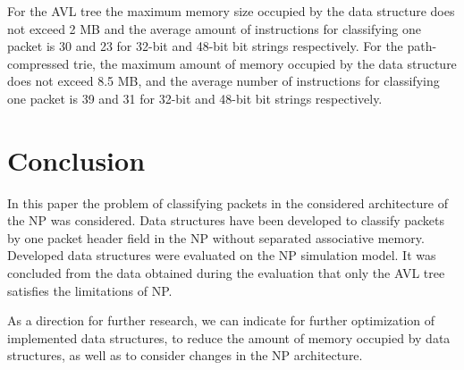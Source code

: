 \documentclass[conference]{IEEEtran}
\begin{document}
            For the AVL tree the maximum memory size occupied 
            by the data structure does not exceed 2 MB and the average amount of
            instructions for classifying one packet is 30 and 23 for 32-bit and 48-bit bit strings respectively.
            For the path-compressed trie, the maximum amount of memory occupied 
            by the data structure does not exceed 8.5 MB, and the average number of
            instructions for classifying one packet is 39 and 31 for 32-bit and 48-bit bit strings respectively.

    \section{Conclusion}
        In this paper the problem of classifying packets in the considered architecture of the NP was considered.
        Data structures have been developed to classify packets by one packet header field
        in the NP without separated associative memory.
        Developed data structures were evaluated on the NP simulation model.
        It was concluded from the data obtained during the evaluation that only the AVL tree satisfies the limitations of NP.

        As a direction for further research, we can indicate for further optimization of implemented data structures,
        to reduce the amount of memory occupied by data structures, as well as to consider changes in the NP architecture.

\printbibliography{}
\end{document}
